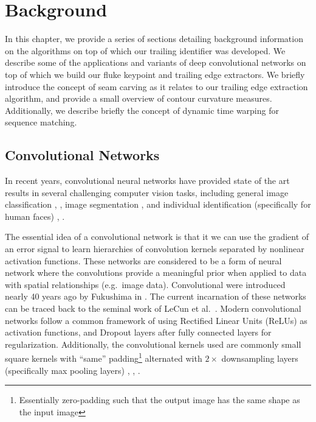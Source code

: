  
\chapter{Background} \label{sec:background}

In this chapter, we provide a series of sections detailing background information on the algorithms on top of which our trailing identifier was developed.
We describe some of the applications and variants of deep convolutional networks on top of which we build our fluke keypoint and trailing edge extractors.
We briefly introduce the concept of seam carving as it relates to our trailing edge extraction algorithm, and provide a small overview of contour curvature measures.
Additionally, we describe briefly the concept of dynamic time warping for sequence matching.

\section{Convolutional Networks}

In recent years, convolutional neural networks have provided state of the art results in several challenging computer vision tasks, including general image classification \cite{krizhevsky2012imagenet}, \cite{szegedy2015going}, image segmentation \cite{long2015fully}, \cite{chen2014semantic} and individual identification (specifically for human faces) \cite{fan2014learning}, \cite{schroff2015facenet}.

The essential idea of a convolutional network is that it we can use the gradient of an error signal to learn hierarchies of convolution kernels separated by nonlinear activation functions.
These networks are considered to be a form of neural network where the convolutions provide a meaningful prior when applied to data with spatial relationships (e.g.\ image data).
Convolutional were introduced nearly 40 years ago by Fukushima in \cite{fukushima1979neural}.
The current incarnation of these networks can be traced back to the seminal work of LeCun et al.\ \cite{lecun1998gradient}.
Modern convolutional networks follow a common framework of using Rectified Linear Units (ReLUs) as activation functions, and Dropout \cite{hinton2012improving} layers after fully connected layers for regularization.
Additionally, the convolutional kernels used are commonly small square kernels with ``same'' padding\footnote{Essentially zero-padding such that the output image has the same shape as the input image} alternated with $2\times$ downsampling layers (specifically max pooling layers) \cite{simonyan2014very}, \cite{sermanet2013overfeat}, \cite{krizhevsky2012imagenet}.

